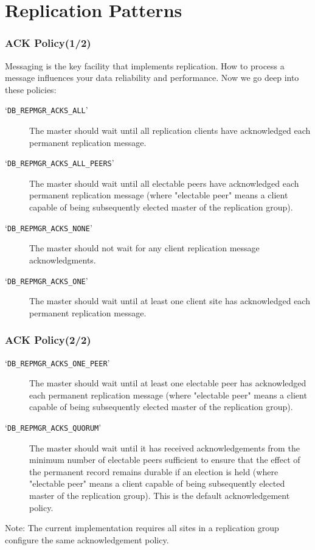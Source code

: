 \documentclass{beamer}
\newcommand{\command}[1]{`\texttt{#1}'}
\newcommand{\mysection}[1]{\section{#1}\frame{\frametitle{#1}\tableofcontents[sectionstyle=show/shaded,subsectionstyle=show/shaded/shaded]}}
\begin{document}
\mysection{Replication Patterns}
\begin{frame}
\frametitle{ACK Policy(1/2)}
Messaging is the key facility that implements replication. 
How to process a message influences your data reliability and performance. 
Now we go deep into these policies:
\begin{description}
\item[\command{DB\_REPMGR\_ACKS\_ALL}]
The master should wait until all replication clients have acknowledged each permanent replication message. 
\item[\command{DB\_REPMGR\_ACKS\_ALL\_PEERS}]
The master should wait until all electable peers have acknowledged each permanent replication message (where "electable peer" means a client capable of being subsequently elected master of the replication group). 
\item[\command{DB\_REPMGR\_ACKS\_NONE}]
The master should not wait for any client replication message acknowledgments. 
\item[\command{DB\_REPMGR\_ACKS\_ONE}]
The master should wait until at least one client site has acknowledged each permanent replication message. 
\end{description}
\end{frame}

\begin{frame}
\frametitle{ACK Policy(2/2)}
\begin{description}
\item[\command{DB\_REPMGR\_ACKS\_ONE\_PEER}]
The master should wait until at least one electable peer has acknowledged each permanent replication message (where "electable peer" means a client capable of being subsequently elected master of the replication group). 
\item[\command{DB\_REPMGR\_ACKS\_QUORUM}]
    The master should wait until it has received acknowledgements from the minimum number of electable peers sufficient to ensure that the effect of the permanent record remains durable if an election is held (where "electable peer" means a client capable of being subsequently elected master of the replication group). This is the default acknowledgement policy. 
\end{description}
\alert{Note:} The current implementation requires all sites in a replication group configure the same acknowledgement policy.
\end{frame}
\end{document}
